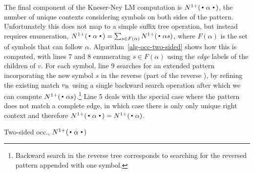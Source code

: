 The final component of the Kneser-Ney LM computation is
$\nlplus{\dotpatdot}$, the number of unique contexts considering
symbols on both sides of the pattern. 
Unfortunately this does not map to a simple suffix tree operation,
but instead requires enumeration,
$\nlplus{\dotpatdot} = \sum_{s \in F(\alpha)} \nlplus{\dotpat s}$, 
where $F(\alpha)$ is the set of symbols that can follow $\alpha$.
Algorithm~\ref{alg-occ-two-sided} shows how this is computed, with lines 7 and 8 enumerating $s \in F(\alpha)$ using the \emph{edge} labels of the children of $v$.
For each symbol, line 9 searches for an extended pattern incorporating
the new symbol $s$ in the reverse \CSA (part of the reverse \CST), by
refining the existing match $v_{\text{R}}$ using a single backward search
operation after which we can compute $\nlplus{\dotpat
  s}$.\footnote{Backward search in the reverse tree corresponds to
  searching for the reversed pattern appended with one symbol.}
Line 5 deals with the special case where the pattern does not match a complete edge, in which case there is only only unique right context and therefore $\nlplus{\dotpatdot} = \nlplus{\dotpat}$.

\begin{algorithm}[t]
  \caption{Two-sided occ., $\nlplus{\dotpatdot}$ 
    \label{alg:n1plusfb}}
\footnotesize
  \begin{algorithmic}[1]
        \Else
           \For{$\chf \gets \children{\tf}{\nf}$} 
            \EndFor
        \EndIf
      \State {}
    \EndFunction
  \end{algorithmic}
\label{alg-occ-two-sided}
\end{algorithm}

